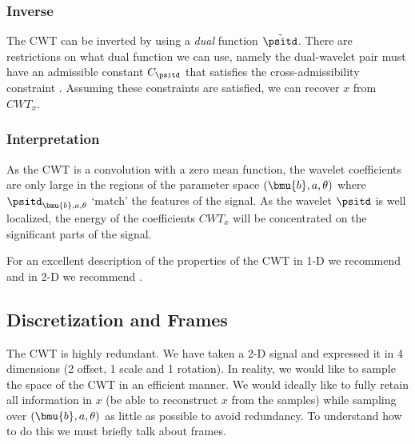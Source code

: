 \subsubsection{Inverse}
The CWT can be inverted by using a \emph{dual} function $\tilde{\psitd}$. There
are restrictions on what dual function we can use, namely the dual-wavelet pair
must have an admissible constant $C_\psitd$ that satisfies the
cross-admissibility constraint \cite{holschneider_pointwise_1991}. Assuming
these constraints are satisfied, we can recover $x$ from $CWT_x$.

\subsubsection{Interpretation}
As the CWT is a convolution with a zero mean function, the wavelet coefficients are only
large in the regions of the parameter space $(\bmu{b}, a, \theta)$ where
$\psitd_{\bmu{b}, a, \theta}$ `match' the features of the signal. As the wavelet
$\psitd$ is well localized, the energy of the coefficients $CWT_x$ will be concentrated
on the significant parts of the signal.

For an excellent description of the properties of the CWT in 1-D we recommend
\cite{vetterli_wavelets_2007} and in 2-D we recommend
\cite{antoine_two-dimensional_2004}.

\subsection{Discretization and Frames}
The CWT is highly redundant. We have taken a 2-D signal and expressed it in 4
dimensions (2 offset, 1 scale and 1 rotation). In reality, we would like to sample the space
of the CWT in an efficient manner. We would ideally like to fully
retain all information in $x$ (be able to reconstruct $x$ from the samples)
while sampling over $(\bmu{b}, a, \theta)$ as little as possible to avoid
redundancy. To understand how to do this we must briefly talk about frames.

